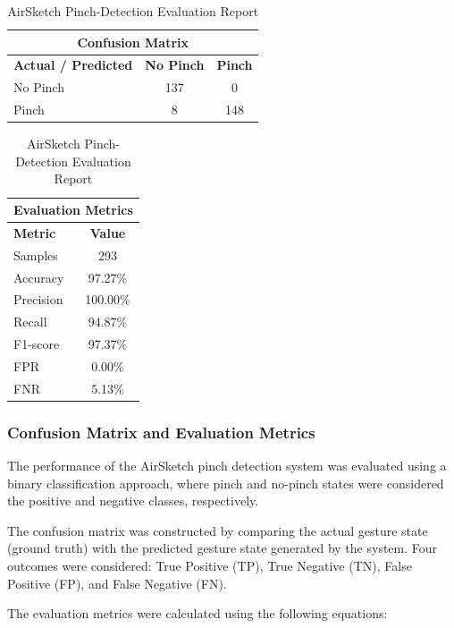 \documentclass[conference]{IEEEtran}
\begin{document}
\begin{table}[!htbp]
\centering
\caption{AirSketch Pinch-Detection Evaluation Report}
\label{tab:evaluation_report}

\setlength{\tabcolsep}{8pt}
\renewcommand{\arraystretch}{1.35}

\begin{tabular}{lcc}
\hline
\multicolumn{3}{c}{\textbf{Confusion Matrix}} \\
\hline
\textbf{Actual / Predicted} & \textbf{No Pinch} & \textbf{Pinch} \\
\hline
No Pinch & 137 & 0 \\
Pinch    & 8   & 148 \\
\hline
\end{tabular}

\vspace{0.35cm}

\begin{tabular}{lc}
\hline
\multicolumn{2}{c}{\textbf{Evaluation Metrics}} \\
\hline
\textbf{Metric} & \textbf{Value} \\
\hline
Samples   & 293 \\
Accuracy  & 97.27\% \\
Precision & 100.00\% \\
Recall    & 94.87\% \\
F1-score  & 97.37\% \\
FPR       & 0.00\% \\
FNR       & 5.13\% \\
\hline
\end{tabular}
\end{table}


\subsubsection{Confusion Matrix and Evaluation Metrics}

The performance of the AirSketch pinch detection system
was evaluated using a binary classification approach,
where pinch and no-pinch states were considered the
positive and negative classes, respectively.

The confusion matrix was constructed by comparing the
actual gesture state (ground truth) with the predicted
gesture state generated by the system. Four outcomes
were considered: True Positive (TP), True Negative (TN),
False Positive (FP), and False Negative (FN).

The evaluation metrics were calculated using the
following equations:
\end{document}
